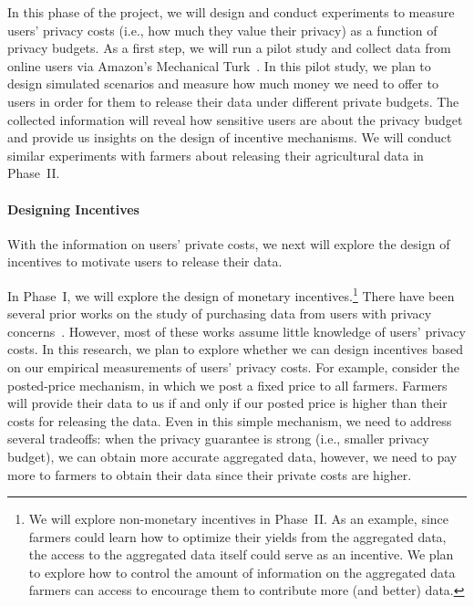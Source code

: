 In this phase of the project, 
we will design and conduct experiments to measure users' privacy costs 
(i.e., how much they value their privacy) as a function of privacy budgets.
As a first step, we will run a pilot study and collect data from online users 
via Amazon's Mechanical Turk~\cite{mturk}. 
In this pilot study, we plan to design simulated scenarios and measure 
how much money we need to offer to users in order for them to 
release their data under different private budgets.
The collected information will reveal how sensitive users are 
about the privacy budget and provide us insights on the design of 
incentive mechanisms.
We will conduct similar experiments with farmers about releasing their
agricultural data in Phase~II.

\paragraph{Designing Incentives} 
With the information on users' private costs, we next will
explore the design of incentives to motivate users to release their data.

In Phase~I, we will explore the design of monetary
incentives.\footnote{We  %
will explore non-monetary incentives in Phase~II. 
As an example, since farmers could learn
how to optimize their yields from the aggregated data, the access to the
aggregated data itself could serve as an incentive. 
We plan to explore how to control the amount of information on the aggregated data
farmers can access to encourage them to contribute 
more (and better) data.} %
There have been several prior works on the study of purchasing data from 
users with privacy concerns~\cite{CCK+16,GR11,LL+14,LR12,X13}. 
However, most of these works assume little knowledge of users' privacy costs.
In this research, we plan to explore whether we can design incentives
based on our empirical measurements of users' privacy costs.
For example, consider the posted-price mechanism, 
in which we post a fixed price to all farmers.
Farmers will provide their data to us if and only if our posted price is higher
than their costs for releasing the data.
Even in this simple mechanism, we need to address several tradeoffs:
when the privacy guarantee is strong (i.e., smaller privacy budget), 
we can obtain more accurate aggregated data, however, 
we need to pay more to farmers to obtain their data since their private costs 
are higher. 

